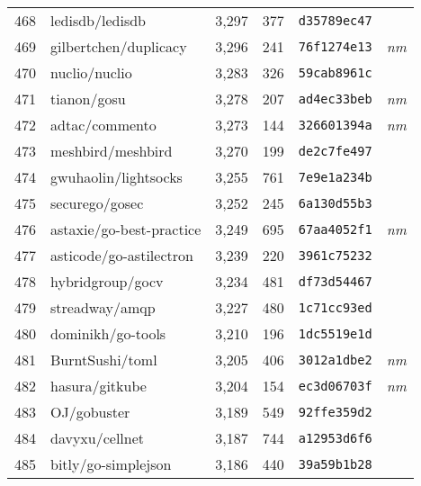 {\begin{supertabular}{llrrll}
        468 &                    ledisdb/ledisdb &  3,297 &    377 &  \texttt{d35789ec47} &              \\
        469 &              gilbertchen/duplicacy &  3,296 &    241 &  \texttt{76f1274e13} &  \textit{nm} \\
        470 &                      nuclio/nuclio &  3,283 &    326 &  \texttt{59cab8961c} &              \\
        471 &                        tianon/gosu &  3,278 &    207 &  \texttt{ad4ec33beb} &  \textit{nm} \\
        472 &                     adtac/commento &  3,273 &    144 &  \texttt{326601394a} &  \textit{nm} \\
        473 &                  meshbird/meshbird &  3,270 &    199 &  \texttt{de2c7fe497} &              \\
        474 &               gwuhaolin/lightsocks &  3,255 &    761 &  \texttt{7e9e1a234b} &              \\
        475 &                     securego/gosec &  3,252 &    245 &  \texttt{6a130d55b3} &              \\
        476 &           astaxie/go-best-practice &  3,249 &    695 &  \texttt{67aa4052f1} &  \textit{nm} \\
        477 &            asticode/go-astilectron &  3,239 &    220 &  \texttt{3961c75232} &              \\
        478 &                   hybridgroup/gocv &  3,234 &    481 &  \texttt{df73d54467} &              \\
        479 &                     streadway/amqp &  3,227 &    480 &  \texttt{1c71cc93ed} &              \\
        480 &                  dominikh/go-tools &  3,210 &    196 &  \texttt{1dc5519e1d} &              \\
        481 &                    BurntSushi/toml &  3,205 &    406 &  \texttt{3012a1dbe2} &  \textit{nm} \\
        482 &                     hasura/gitkube &  3,204 &    154 &  \texttt{ec3d06703f} &  \textit{nm} \\
        483 &                        OJ/gobuster &  3,189 &    549 &  \texttt{92ffe359d2} &              \\
        484 &                     davyxu/cellnet &  3,187 &    744 &  \texttt{a12953d6f6} &              \\
        485 &                bitly/go-simplejson &  3,186 &    440 &  \texttt{39a59b1b28} &              \\

\end{supertabular}}
